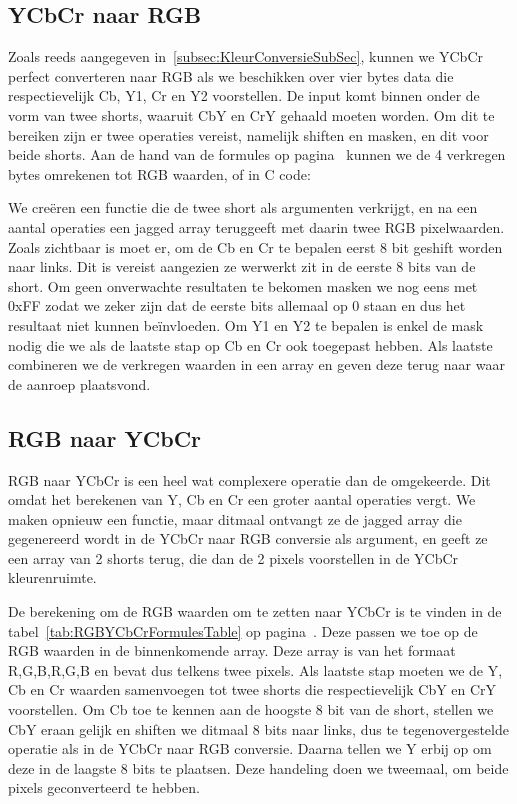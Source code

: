 	\subsection{YCbCr naar RGB}
		\par Zoals reeds aangegeven in~\ref{subsec:KleurConversieSubSec}, kunnen we YCbCr perfect converteren naar RGB als we beschikken over vier bytes data die respectievelijk Cb, Y1, Cr en Y2 voorstellen. De input komt binnen onder de vorm van twee shorts, waaruit CbY en CrY gehaald moeten worden. Om dit te bereiken zijn er twee operaties vereist, namelijk shiften en masken, en dit voor beide shorts. Aan de hand van de formules op pagina~\pageref{tab:RGBYCbCrFormulesTable} kunnen we de 4 verkregen bytes omrekenen tot RGB waarden, of in C code:
		\smallskip
		

		\par We cre\"eren een functie die de twee short als argumenten verkrijgt, en na een aantal operaties een jagged array teruggeeft met daarin twee RGB pixelwaarden. Zoals zichtbaar is moet er, om de Cb en Cr te bepalen eerst 8 bit geshift worden naar links. Dit is vereist aangezien ze werwerkt zit in de eerste 8 bits van de short. Om geen onverwachte resultaten te bekomen masken we nog eens met 0xFF zodat we zeker zijn dat de eerste bits allemaal op 0 staan en dus het resultaat niet kunnen be\"invloeden. Om Y1 en Y2 te bepalen is enkel de mask nodig die we als de laatste stap op Cb en Cr ook toegepast hebben. Als laatste combineren we de verkregen waarden in een array en geven deze terug naar waar de aanroep plaatsvond.

	\subsection{RGB naar YCbCr}
		\par RGB naar YCbCr is een heel wat complexere operatie dan de omgekeerde. Dit omdat het berekenen van Y, Cb en Cr een groter aantal operaties vergt. We maken opnieuw een functie, maar ditmaal ontvangt ze de jagged array die gegenereerd wordt in de YCbCr naar RGB conversie als argument, en geeft ze een array van 2 shorts terug, die dan de 2 pixels voorstellen in de YCbCr kleurenruimte.
		\smallskip
		

		De berekening om de RGB waarden om te zetten naar YCbCr is te vinden in de tabel~\ref{tab:RGBYCbCrFormulesTable} op pagina~\pageref{tab:RGBYCbCrFormulesTable}. Deze passen we toe op de RGB waarden in de binnenkomende array. Deze array is van het formaat {{R,G,B},{R,G,B}} en bevat dus telkens twee pixels. Als laatste stap moeten we de Y, Cb en Cr waarden samenvoegen tot twee shorts die respectievelijk CbY en CrY voorstellen. Om Cb toe te kennen aan de hoogste 8 bit van de short, stellen we CbY eraan gelijk en shiften we ditmaal 8 bits naar links, dus te tegenovergestelde operatie als in de YCbCr naar RGB conversie. Daarna tellen we Y erbij op om deze in de laagste 8 bits te plaatsen. Deze handeling doen we tweemaal, om beide pixels geconverteerd te hebben.

